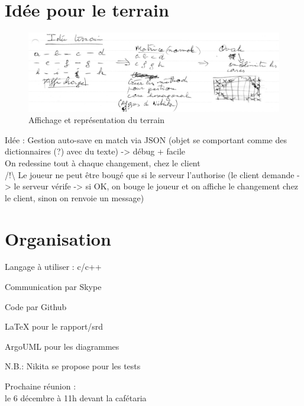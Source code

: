 \documentclass[a4paper,10pt]{article}
\begin{document}
\part*{Idée pour le terrain}
\begin{figure}[!h]
\centering
\includegraphics[scale=0.8]{schema4_pv1.jpg}
\caption{Affichage et représentation du terrain}
\end{figure}
Idée : Gestion auto-save en match via JSON (objet se comportant comme des dictionnaires (?) avec du texte) -> débug + facile \\
On redessine tout à chaque changement, chez le client\\
/!\textbackslash{} Le joueur ne peut être bougé que si le serveur l'authorise (le client demande -> le serveur vérife -> si OK, on bouge le joueur et on affiche le changement chez le client, sinon on renvoie un message)
\part*{Organisation}
\begin{description}
\item Langage à utiliser : c/c++
\item Communication par Skype
\item Code par Github
\item LaTeX pour le rapport/srd
\item ArgoUML pour les diagrammes
\item N.B.: Nikita se propose pour les tests
\item 
\item 
\item \LARGE Prochaine réunion :\\ le 6 décembre à 11h devant la cafétaria
\end{description}
\end{document}
